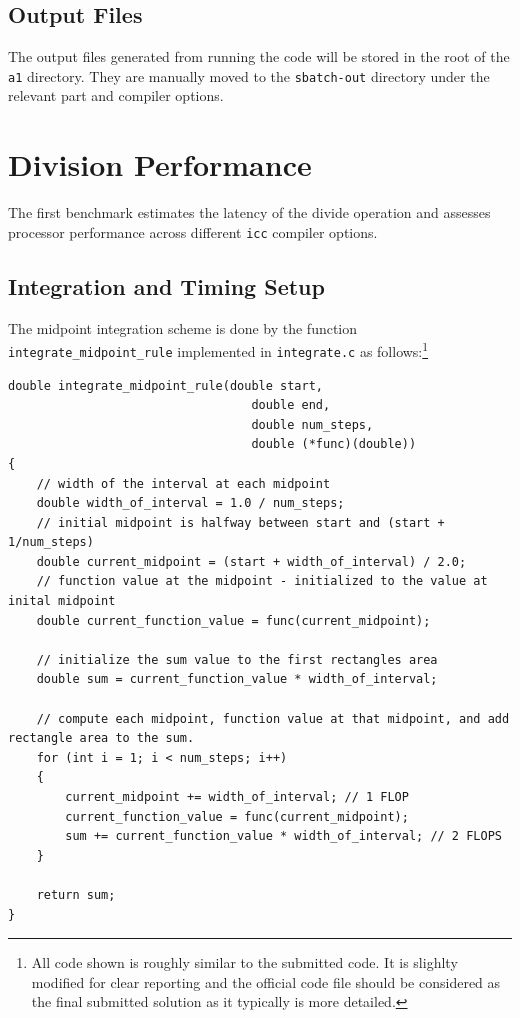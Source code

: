 \documentclass{article}
\begin{document}
\subsection{Output Files}
The output files generated from running the code will be stored in the root of the \texttt{a1} directory. They are manually moved 
to the \texttt{sbatch-out} directory under the relevant part and compiler options.

\section{Division Performance}
The first benchmark estimates the latency of the divide operation and assesses 
processor performance across different \texttt{icc} compiler options. 
\subsection*{Integration and Timing Setup}
The midpoint integration scheme is done by the function \texttt{integrate\_midpoint\_rule} implemented 
in \texttt{integrate.c} as follows:\footnote{All code shown is roughly similar to the 
submitted code. It is slighlty modified for clear reporting and the official code file 
should be considered as the final submitted solution as it typically is more detailed.}
\begin{lstlisting}
double integrate_midpoint_rule(double start,
                                  double end,
                                  double num_steps,
                                  double (*func)(double))
{
    // width of the interval at each midpoint
    double width_of_interval = 1.0 / num_steps; 
    // initial midpoint is halfway between start and (start + 1/num_steps)
    double current_midpoint = (start + width_of_interval) / 2.0;
    // function value at the midpoint - initialized to the value at inital midpoint
    double current_function_value = func(current_midpoint);

    // initialize the sum value to the first rectangles area
    double sum = current_function_value * width_of_interval;

    // compute each midpoint, function value at that midpoint, and add rectangle area to the sum.
    for (int i = 1; i < num_steps; i++)
    {
        current_midpoint += width_of_interval; // 1 FLOP
        current_function_value = func(current_midpoint);
        sum += current_function_value * width_of_interval; // 2 FLOPS
    }

    return sum;
}
\end{lstlisting}
\end{document}
